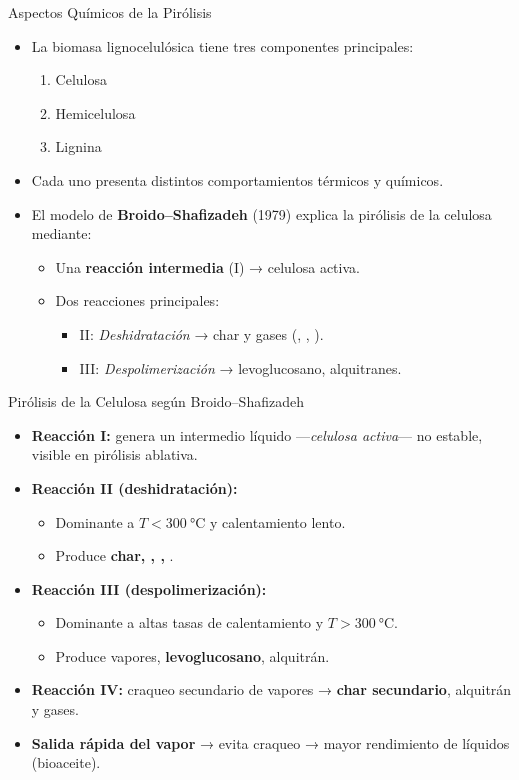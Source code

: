 \documentclass[../../main.tex]{subfiles}
\begin{document}
\begin{frame}{Aspectos Químicos de la Pirólisis}
\small
\begin{itemize}
  \item La biomasa lignocelulósica tiene tres componentes principales:
  \begin{enumerate}
    \item Celulosa
    \item Hemicelulosa
    \item Lignina
  \end{enumerate}
  \item Cada uno presenta distintos comportamientos térmicos y químicos.
  \item El modelo de \textbf{Broido–Shafizadeh} (1979) explica la pirólisis de la celulosa mediante:
  \begin{itemize}
    \item Una \textbf{reacción intermedia} (I) → celulosa activa.
    \item Dos reacciones principales:
      \begin{itemize}
        \item II: \textit{Deshidratación} → char y gases (, , ).
        \item III: \textit{Despolimerización} → levoglucosano, alquitranes.
      \end{itemize}
  \end{itemize}
\end{itemize}
\end{frame}

\begin{frame}{Pirólisis de la Celulosa según Broido–Shafizadeh}
\small
\begin{itemize}
  \item \textbf{Reacción I:} genera un intermedio líquido —\textit{celulosa activa}— no estable, visible en pirólisis ablativa.
  \item \textbf{Reacción II (deshidratación):}
  \begin{itemize}
    \item Dominante a $T<\SI{300}{\degreeCelsius}$ y calentamiento lento.
    \item Produce \textbf{char, , , }.
  \end{itemize}
  \item \textbf{Reacción III (despolimerización):}
  \begin{itemize}
    \item Dominante a altas tasas de calentamiento y $T>\SI{300}{\degreeCelsius}$.
    \item Produce vapores, \textbf{levoglucosano}, alquitrán.
  \end{itemize}
  \item \textbf{Reacción IV:} craqueo secundario de vapores → \textbf{char secundario}, alquitrán y gases.
  \item \textbf{Salida rápida del vapor} → evita craqueo → mayor rendimiento de líquidos (bioaceite).
\end{itemize}
\end{frame}
\end{document}
